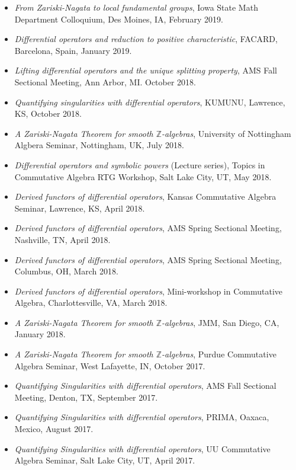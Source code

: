 \documentclass[12pt]{amsart}
\begin{document}
\begin{itemize}[leftmargin=9mm]
	\item \emph{From Zariski-Nagata to local fundamental groups}, Iowa State Math Department Colloquium, Des Moines, IA, February 2019.
	\item \emph{Differential operators and reduction to positive characteristic}, FACARD, Barcelona, Spain, January 2019.	
	\item \emph{Lifting differential operators and the unique splitting property}, AMS Fall Sectional Meeting, Ann Arbor, MI. October 2018.
	\item \emph{Quantifying singularities with differential operators}, KUMUNU, Lawrence, KS, October 2018.
	\item \emph{A Zariski-Nagata Theorem for smooth $\mathbb{Z}$-algebras}, University of Nottingham Algbera Seminar, Nottingham, UK, July 2018.
	\item \emph{Differential operators and symbolic powers} (Lecture series), Topics in Commutative Algebra RTG Workshop, Salt Lake City, UT, May 2018.
	\item \emph{Derived functors of differential operators}, Kansas Commutative Algebra Seminar, Lawrence, KS, April 2018.
	\item \emph{Derived functors of differential operators}, AMS Spring Sectional Meeting, Nashville, TN, April 2018.
	\item \emph{Derived functors of differential operators}, AMS Spring Sectional Meeting, Columbus, OH, March 2018.
	\item \emph{Derived functors of differential operators}, Mini-workshop in Commutative Algebra, Charlottesville, VA, March 2018.
	\item \emph{A Zariski-Nagata Theorem for smooth $\mathbb{Z}$-algebras}, JMM, San Diego, CA, January 2018.
	
	\item \emph{A Zariski-Nagata Theorem for smooth $\mathbb{Z}$-algebras}, Purdue Commutative Algebra Seminar, West Lafayette, IN, October 2017.
	
	\item \emph{Quantifying Singularities with differential operators}, AMS Fall Sectional Meeting, Denton, TX, September 2017.
	
	\item \emph{Quantifying Singularities with differential operators}, PRIMA, Oaxaca, Mexico, August 2017.
	
	\item \emph{Quantifying Singularities with differential operators}, UU Commutative Algebra Seminar, Salt Lake City, UT, April 2017.


\end{itemize}
\end{document}
